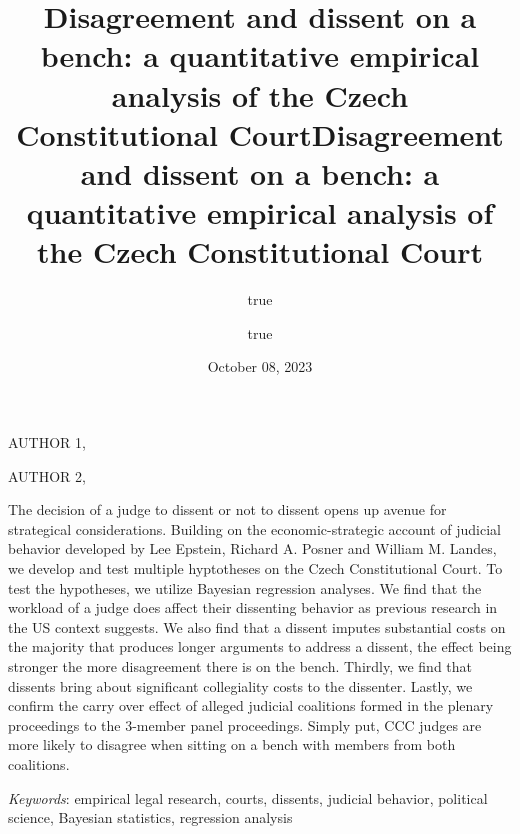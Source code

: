 \documentclass[
  11pt,
]{article}
\title{Disagreement and dissent on a bench: a quantitative empirical
analysis of the Czech Constitutional Court}
\author{true \and true}
\date{October 08, 2023}
\title{Disagreement and dissent on a bench: a quantitative empirical
analysis of the Czech Constitutional Court }
\date{}
\renewenvironment{abstract}
 {{%
    \setlength{\leftmargin}{0mm}
    \setlength{\rightmargin}{\leftmargin}%
  }%
  \relax}
 {\endlist}
\begin{document}



{%
\setlength{\parindent}{0pt}
\thispagestyle{plain}
{%
\maketitle  %

}




{
   \vskip 13.5pt\relax \normalsize\fontsize{11}{12}
   \MakeUppercase{Author
1}, \small{}   \par \vskip -3.5pt \MakeUppercase{Author 2}, \small{}   

}

}








\begin{abstract}


    \vskip 8.5pt %

\noindent \small{The decision of a judge to dissent or not to dissent
opens up avenue for strategical considerations. Building on the
economic-strategic account of judicial behavior developed by Lee
Epstein, Richard A. Posner and William M. Landes, we develop and test
multiple hyptotheses on the Czech Constitutional Court. To test the
hypotheses, we utilize Bayesian regression analyses. We find that the
workload of a judge does affect their dissenting behavior as previous
research in the US context suggests. We also find that a dissent imputes
substantial costs on the majority that produces longer arguments to
address a dissent, the effect being stronger the more disagreement there
is on the bench. Thirdly, we find that dissents bring about significant
collegiality costs to the dissenter. Lastly, we confirm the carry over
effect of alleged judicial coalitions formed in the plenary proceedings
to the 3-member panel proceedings. Simply put, CCC judges are more
likely to disagree when sitting on a bench with members from both
coalitions.}


\vskip 8.5pt \noindent \emph{Keywords}: empirical legal research,
courts, dissents, judicial behavior, political science, Bayesian
statistics, regression analysis \par




\end{abstract}
\end{document}
